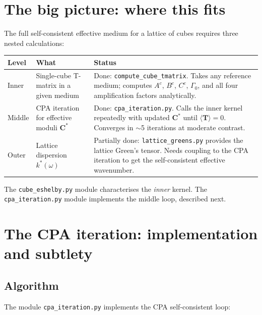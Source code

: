 \documentclass[11pt,a4paper]{article}
\newcommand{\bT}{\bm{T}}
\newcommand{\bC}{\bm{C}}
\begin{document}
\section{The big picture: where this fits}

The full self-consistent effective medium for a lattice of cubes
requires three nested calculations:

\begin{center}
\renewcommand{\arraystretch}{1.3}
\begin{tabular}{llp{7.5cm}}
\toprule
\textbf{Level} & \textbf{What} & \textbf{Status} \\
\midrule
Inner &
  Single-cube T-matrix in a given medium &
  Done: \texttt{compute\_cube\_tmatrix}.
  Takes any reference medium; computes $A^c$, $B^c$, $C^c$,
  $\Gamma_0$, and all four amplification factors analytically. \\
Middle &
  CPA iteration for effective moduli $\bC^*$ &
  Done: \texttt{cpa\_iteration.py}.  Calls the inner kernel
  repeatedly with updated $\bC^*$ until $\langle\bT\rangle = 0$.
  Converges in $\sim$5 iterations at moderate contrast. \\
Outer &
  Lattice dispersion $k^*(\omega)$ &
  Partially done: \texttt{lattice\_greens.py} provides the
  lattice Green's tensor.  Needs coupling to the CPA iteration
  to get the self-consistent effective wavenumber. \\
\bottomrule
\end{tabular}
\end{center}

The \texttt{cube\_eshelby.py} module characterises the
\emph{inner} kernel.  The \texttt{cpa\_iteration.py} module
implements the middle loop, described next.

\section{The CPA iteration: implementation and subtlety}
\label{sec:cpa}

\subsection{Algorithm}

The module \texttt{cpa\_iteration.py} implements the CPA
self-consistent loop:
\end{document}
